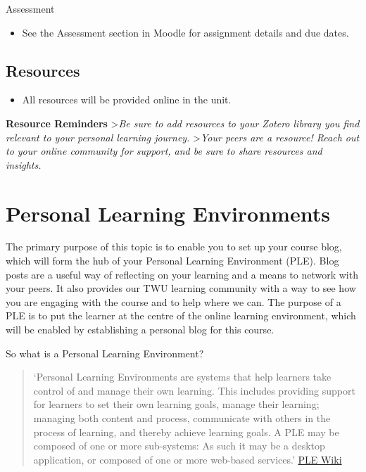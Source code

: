 \documentclass[
]{book}
\providecommand{\tightlist}{%
  \setlength{\itemsep}{0pt}\setlength{\parskip}{0pt}}
\theoremstyle{definition}
\theoremstyle{definition}
\theoremstyle{definition}
\theoremstyle{definition}
\theoremstyle{remark}
\begin{document}
\begin{assessment}
{Assessment}

\begin{itemize}
\tightlist
\item
  See the Assessment section in Moodle for assignment details and due dates.
\end{itemize}
\end{assessment}

\hypertarget{resources-3}{%
\subsection*{Resources}\label{resources-3}}

\begin{itemize}
\tightlist
\item
  All resources will be provided online in the unit.
\end{itemize}

\textbf{Resource Reminders}
\textgreater{}\emph{Be sure to add resources to your Zotero library you find relevant to your personal learning journey.}
\textgreater{}\emph{Your peers are a resource! Reach out to your online community for support, and be sure to share resources and insights.}

\hypertarget{personal-learning-environments}{%
\section{Personal Learning Environments}\label{personal-learning-environments}}

The primary purpose of this topic is to enable you to set up your course blog, which will form the hub of your Personal Learning Environment (PLE). Blog posts are a useful way of reflecting on your learning and a means to network with your peers. It also provides our TWU learning community with a way to see how you are engaging with the course and to help where we can. The purpose of a PLE is to put the learner at the centre of the online learning environment, which will be enabled by establishing a personal blog for this course.

So what is a Personal Learning Environment?

\begin{quote}
`Personal Learning Environments are systems that help learners take control of and manage their own learning. This includes providing support for learners to set their own learning goals, manage their learning; managing both content and process, communicate with others in the process of learning, and thereby achieve learning goals. A PLE may be composed of one or more sub-systems: As such it may be a desktop application, or composed of one or more web-based services.' \href{https://edutechwiki.unige.ch/en/Personal_learning_environment}{PLE Wiki}
\end{quote}
\end{document}
